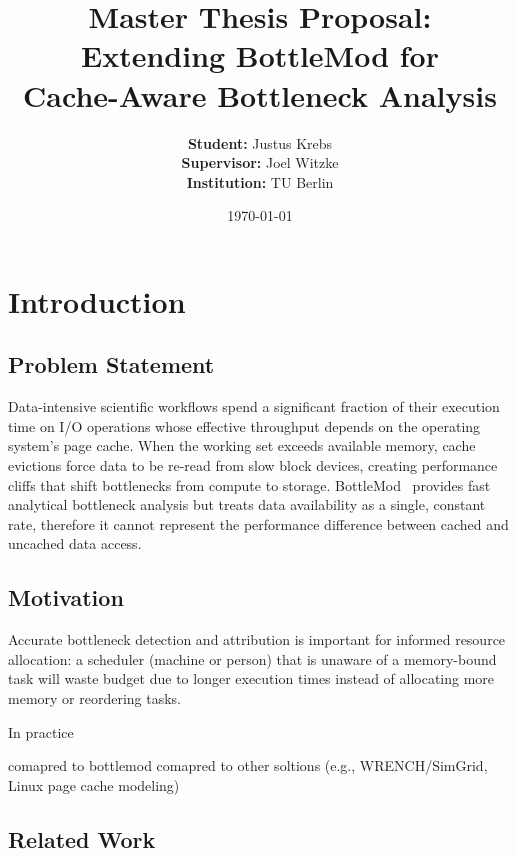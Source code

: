\documentclass[11pt,a4paper]{article}
\title{Master Thesis Proposal:\\[4pt]
Extending BottleMod for\\
Cache-Aware Bottleneck Analysis}
\author{%
  \textbf{Student:} Justus Krebs \\
  \textbf{Supervisor:} Joel Witzke \\
  \textbf{Institution:} TU Berlin}
\date{\today}
\begin{document}
\maketitle

\section{Introduction}

\subsection{Problem Statement}
Data-intensive scientific workflows spend a significant fraction of their execution time on I/O operations whose effective throughput depends on the operating system's page cache.
When the working set exceeds available memory, cache evictions force data to be re-read from slow block devices, creating performance cliffs that shift bottlenecks from compute to storage.
BottleMod~\cite{bottlemod} provides fast analytical bottleneck analysis but treats data availability as a single, constant rate, therefore it cannot represent the performance difference between cached and uncached data access.

\subsection{Motivation}
Accurate bottleneck detection and attribution is important for informed resource allocation: a scheduler (machine or person) that is unaware of a memory-bound task will waste budget due to longer execution times instead of allocating more memory or reordering tasks.

In practice

comapred to bottlemod
comapred to other soltions (e.g., WRENCH/SimGrid, Linux page cache modeling)

\subsection{Related Work}
\end{document}
